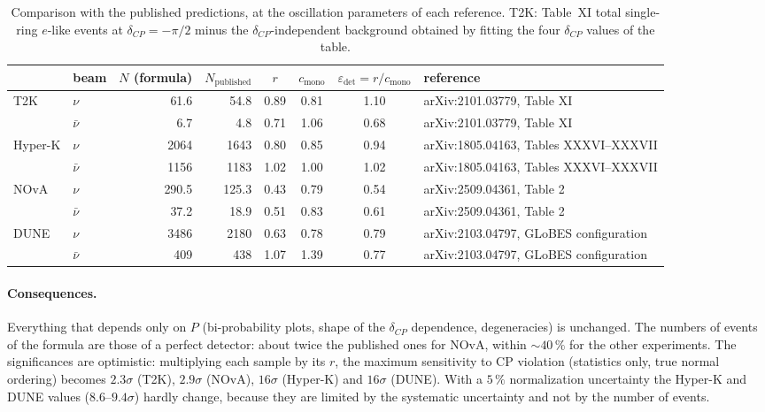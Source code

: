 \documentclass[11pt,a4paper]{article}
\begin{document}
\begin{table}[!htb]
\centering
\caption{Comparison with the published predictions, at the oscillation parameters of each reference.
T2K: Table~XI total single-ring $e$-like events at $\delta_{CP}=-\pi/2$ minus the $\delta_{CP}$-independent background
obtained by fitting the four $\delta_{CP}$ values of the table.}
\label{tab:r}
\footnotesize
\setlength{\tabcolsep}{4pt}
\begin{tabular}{llrrcccl}
\toprule
 & beam & $N$ (formula) & $N_\text{published}$ & $r$ & $c_\text{mono}$ & $\varepsilon_\text{det}=r/c_\text{mono}$ & reference \\
\midrule
T2K     & $\nu$     & 61.6   & 54.8 & 0.89 & 0.81 & 1.10 & arXiv:2101.03779, Table XI \\
        & $\bar\nu$ & 6.7    & 4.8  & 0.71 & 1.06 & 0.68 & arXiv:2101.03779, Table XI \\
Hyper-K & $\nu$     & 2064   & 1643 & 0.80 & 0.85 & 0.94 & arXiv:1805.04163, Tables XXXVI--XXXVII \\
        & $\bar\nu$ & 1156   & 1183 & 1.02 & 1.00 & 1.02 & arXiv:1805.04163, Tables XXXVI--XXXVII \\
NOvA    & $\nu$     & 290.5  & 125.3 & 0.43 & 0.79 & 0.54 & arXiv:2509.04361, Table 2 \\
        & $\bar\nu$ & 37.2   & 18.9 & 0.51 & 0.83 & 0.61 & arXiv:2509.04361, Table 2 \\
DUNE    & $\nu$     & 3486   & 2180 & 0.63 & 0.78 & 0.79 & arXiv:2103.04797, GLoBES configuration \\
        & $\bar\nu$ & 409    & 438  & 1.07 & 1.39 & 0.77 & arXiv:2103.04797, GLoBES configuration \\
\bottomrule
\end{tabular}
\end{table}

\paragraph{Consequences.} Everything that depends only on $P$ (bi-probability plots, shape of the $\delta_{CP}$
dependence, degeneracies) is unchanged. The numbers of events of the formula are those of a perfect detector: about
twice the published ones for NOvA, within ${\sim}40\,\%$ for the other experiments. The significances are optimistic:
multiplying each sample by its $r$, the maximum sensitivity to CP violation (statistics only, true normal ordering)
becomes $2.3\sigma$ (T2K), $2.9\sigma$ (NOvA), $16\sigma$ (Hyper-K) and $16\sigma$ (DUNE). With a $5\,\%$ normalization
uncertainty the Hyper-K and DUNE values ($8.6$--$9.4\sigma$) hardly change, because they are limited by the systematic
uncertainty and not by the number of events.
\end{document}
